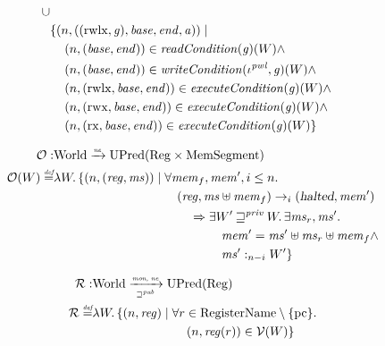 \documentclass[a4paper]{article}
\newcommand{\nefun}{\xrightarrow{\textit{\tiny{ne}}}}
\newcommand{\defeq}{\stackrel{\textit{\tiny{def}}}{=}}
\newcommand{\union}{\mathbin{\cup}}
\newcommand{\var}[1]{\mathit{#1}}
\newcommand{\hs}{\var{ms}}
\newcommand{\gl}{\var{g}}
\newcommand{\pcreg}{\mathrm{pc}}
\newcommand{\addr}{\var{a}}
\newcommand{\start}{\var{base}}
\newcommand{\addrend}{\var{end}}
\newcommand{\reg}{\var{reg}}
\newcommand{\heap}{\var{mem}}
\newcommand{\perm}{\var{perm}}
\newcommand{\stdcap}[1][(\perm,\gl)]{\left(#1,\start,\addrend,\addr \right)}
\newcommand{\halted}{\textsl{halted}}
\newcommand{\plainfun}[2]{
  \ifthenelse{\equal{#2}{}}
             {\mathit{#1}}
             {\mathit{#1}(#2)}
}
\newcommand{\readCond}[1]{\plainfun{readCondition}{#1}}
\newcommand{\writeCond}[1]{\plainfun{writeCondition}{#1}}
\newcommand{\execCond}[1]{\plainfun{executeCondition}{#1}}
\newcommand{\futurewk}{\mathbin{\sqsupseteq}^{\var{pub}}}
\newcommand{\futurestr}{\mathbin{\sqsupseteq}^{\var{priv}}}
\newcommand{\heapSat}[3][\heap]{#1 :_{#2} #3}
\newcommand{\monwknefun}{\xrightarrow[\text{\tiny{$\futurewk$}}]{\textit{\tiny{mon, ne}}}}
\newcommand{\asmType}{\plaindom{AsmType}}
\newcommand{\plaindom}[1]{\mathrm{#1}}
\newcommand{\RegName}{\plaindom{RegisterName}}
\newcommand{\Regs}{\plaindom{Reg}}
\newcommand{\HeapSegments}{\plaindom{MemSegment}}
\newcommand{\Worlds}{\plaindom{World}}
\newcommand{\UPred}[1]{\plaindom{UPred}(#1)}
\newcommand{\intr}[2]{\mathcal{#1}}
\newcommand{\valueintr}[1]{\intr{V}{#1}}
\newcommand{\regintr}[1]{\intr{R}{#1}}
\newcommand{\stdvr}{\valueintr{\asmType}}
\newcommand{\stdrr}{\regintr{\asmType}}
\newcommand{\observations}{\mathcal{O}}
\newcommand{\npair}[2][n]{\left(#1,#2 \right)}
\newcommand{\plainperm}[1]{\mathrm{#1}}
\newcommand{\exec}{\plainperm{rx}}
\newcommand{\rwx}{\plainperm{rwx}}
\newcommand{\rwlx}{\plainperm{rwlx}}
\newcommand{\step}[1][]{\rightarrow_{#1}}
\begin{document}
\begin{align*}
\begin{aligned}[t]
             \union \\
             & \{ \npair{\stdcap[(\rwlx,\gl)]} \mid \\
             & \quad \npair{(\start,\addrend)} \in \readCond{}(\gl)(W) \land \\
             & \quad \npair{(\start,\addrend)} \in \writeCond{}(\iota^{\var{pwl}},\gl)(W) \land\\
             & \quad \npair{(\rwlx,\start,\addrend)} \in \execCond{}(\gl)(W) \land \\
             & \quad \npair{(\rwx,\start,\addrend)} \in \execCond{}(\gl)(W) \land \\
             & \quad \npair{(\exec,\start,\addrend)} \in \execCond{}(\gl)(W) \}
           \end{aligned}
\end{align*}

\begin{align*}
  \observations : &  \Worlds \nefun \UPred{\Regs \times \HeapSegments} \\
  \observations (W) \defeq & \lambda W \ldotp 
                               \{ \npair{(\reg,\hs)} \mid
                             \begin{aligned}[t]
                               & \forall \heap_f, \heap', i \leq n \ldotp \\
                               & \quad(\reg,\hs \uplus \heap_f) \step[i] (\halted,\heap')  \\
                               & \qquad \Rightarrow
                               \begin{aligned}[t]
                                 & \exists W' \futurestr W \ldotp\exists \hs_r, \hs' \ldotp\\
                                 & \quad \heap' = \hs' \uplus \hs_r \uplus \heap_f \land \\ 
                                 & \quad \heapSat[\hs']{n-i}{W'} \}
                               \end{aligned}
                             \end{aligned}
\end{align*}

\begin{align*}
  \stdrr : & \Worlds \monwknefun \UPred{\Regs} \\
  \stdrr \defeq & \lambda W \ldotp
                     \begin{aligned}[t]
                       \{ \npair{\reg} \mid & \;\forall r \in \RegName \setminus \{\pcreg\} \ldotp \\
                                            & \;\quad  \npair{\reg(r)} \in \stdvr(W) \}
                     \end{aligned}
\end{align*}
\end{document}
